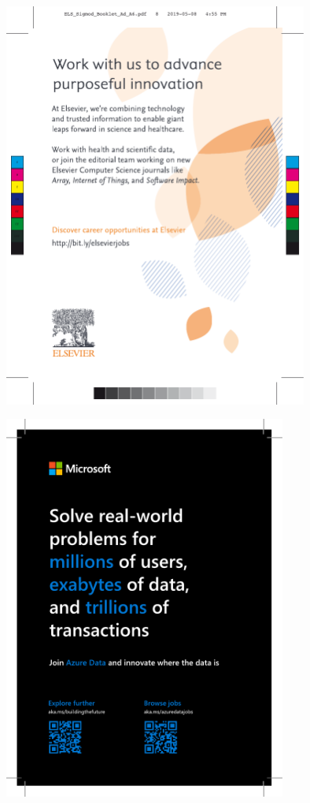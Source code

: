 \begin{minipage}{\textwidth}

\thispagestyle{empty}
\vspace{-3mm}
\hspace*{-7mm}\includegraphics[width=100mm]{ads/elsevier.pdf}
\end{minipage}


\thispagestyle{empty}
\includegraphics[width=93mm]{ads/microsoft.pdf}
\newpage
{}

